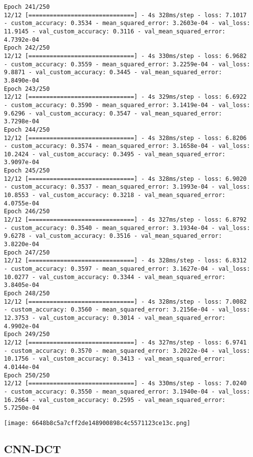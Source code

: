 \begin{lstlisting}
Epoch 241/250
12/12 [==============================] - 4s 328ms/step - loss: 7.1017 - custom_accuracy: 0.3534 - mean_squared_error: 3.2603e-04 - val_loss: 11.9145 - val_custom_accuracy: 0.3116 - val_mean_squared_error: 4.7392e-04
Epoch 242/250
12/12 [==============================] - 4s 330ms/step - loss: 6.9682 - custom_accuracy: 0.3559 - mean_squared_error: 3.2259e-04 - val_loss: 9.8871 - val_custom_accuracy: 0.3445 - val_mean_squared_error: 3.8490e-04
Epoch 243/250
12/12 [==============================] - 4s 329ms/step - loss: 6.6922 - custom_accuracy: 0.3590 - mean_squared_error: 3.1419e-04 - val_loss: 9.6296 - val_custom_accuracy: 0.3547 - val_mean_squared_error: 3.7298e-04
Epoch 244/250
12/12 [==============================] - 4s 328ms/step - loss: 6.8206 - custom_accuracy: 0.3574 - mean_squared_error: 3.1658e-04 - val_loss: 10.2424 - val_custom_accuracy: 0.3495 - val_mean_squared_error: 3.9097e-04
Epoch 245/250
12/12 [==============================] - 4s 328ms/step - loss: 6.9020 - custom_accuracy: 0.3537 - mean_squared_error: 3.1993e-04 - val_loss: 10.8553 - val_custom_accuracy: 0.3218 - val_mean_squared_error: 4.0755e-04
Epoch 246/250
12/12 [==============================] - 4s 327ms/step - loss: 6.8792 - custom_accuracy: 0.3540 - mean_squared_error: 3.1934e-04 - val_loss: 9.6278 - val_custom_accuracy: 0.3516 - val_mean_squared_error: 3.8220e-04
Epoch 247/250
12/12 [==============================] - 4s 328ms/step - loss: 6.8312 - custom_accuracy: 0.3597 - mean_squared_error: 3.1627e-04 - val_loss: 10.0277 - val_custom_accuracy: 0.3344 - val_mean_squared_error: 3.8405e-04
Epoch 248/250
12/12 [==============================] - 4s 328ms/step - loss: 7.0082 - custom_accuracy: 0.3560 - mean_squared_error: 3.2156e-04 - val_loss: 12.3753 - val_custom_accuracy: 0.3014 - val_mean_squared_error: 4.9902e-04
Epoch 249/250
12/12 [==============================] - 4s 327ms/step - loss: 6.9741 - custom_accuracy: 0.3570 - mean_squared_error: 3.2022e-04 - val_loss: 10.1756 - val_custom_accuracy: 0.3413 - val_mean_squared_error: 4.0144e-04
Epoch 250/250
12/12 [==============================] - 4s 330ms/step - loss: 7.0240 - custom_accuracy: 0.3550 - mean_squared_error: 3.1940e-04 - val_loss: 16.2664 - val_custom_accuracy: 0.2595 - val_mean_squared_error: 5.7250e-04
\end{lstlisting}

\texttt{[image: 6648b8c5a7cff2de148900898c4c5571123ce13c.png]}

\hypertarget{cnn-dct}{%
\subsection{CNN-DCT}\label{cnn-dct}}

